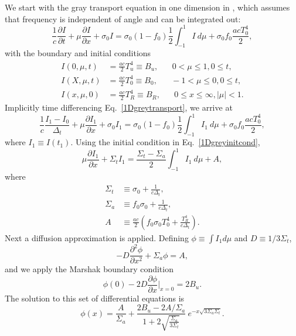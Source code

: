 We start with the gray transport equation in one dimension in \cite{FleckCumm},
which assumes that frequency is independent of angle and can be integrated out:
\begin{equation}
\frac{1}{c}\frac{\partial I}{\partial t} + \mu\frac{\partial I}{\partial x} +
  \sigma_0 I = \sigma_0(1-f_0)\frac{1}{2}\int_{-1}^1 I\ d\mu + \sigma_0f_0
  \frac{acT_0^4}{2},
  \label{1Dgreytransport}
\end{equation}
with the boundary and initial conditions
\begin{align}
I(0,\mu,t)&=\frac{ac}{2}T_u^4\equiv B_u,\hspace{20pt}0<\mu\leq1, 0\leq t,\\
I(X,\mu,t)&=\frac{ac}{2}T_0^4\equiv B_0,\hspace{20pt}-1<\mu\leq0, 0\leq t,\\
I(x,\mu,0)&=\frac{ac}{2}T_R^4\equiv B_R,\hspace{20pt}0\leq x\leq\infty, |\mu|<1.
  \label{1Dgreyinitcond}
\end{align}
Implicitly time differencing Eq.\ \eqref{1Dgreytransport}, we arrive at
\begin{equation}
\frac{1}{c}\frac{I_1-I_0}{\Delta_t}+\mu\frac{\partial I_1}{\partial x} + 
  \sigma_0 I_1 = \sigma_0(1-f_0)\frac{1}{2}\int_{-1}^1I_1\ d\mu + \sigma_0f_0
  \frac{acT_0^4}{2}
  ,\label{1Dgreytimediff}
\end{equation}
where $I_1\equiv I(t_1)$.  Using the initial condition in Eq.\ \eqref{1Dgreyinitcond},
\begin{equation}
\mu\frac{\partial I_1}{\partial x} + \Sigma_tI_1 = \frac{\Sigma_t-\Sigma_a}{2}
  \int_{-1}^1I_1\ d\mu + A,
\end{equation}
where
\begin{align*}
\Sigma_t&\equiv\sigma_0+\frac{1}{c\Delta_t},\\
\Sigma_a&\equiv f_0\sigma_0+\frac{1}{c\Delta_t},\\
A&\equiv\frac{ac}{2}\left(f_0\sigma_0T_0^4 + \frac{T_R^4}{c\Delta_t}\right).
\end{align*}
Next a diffusion approximation is applied.  Defining $\phi\equiv\int I_1d\mu$
and
$D\equiv1/3\Sigma_t$,
\begin{equation}
-D\frac{\partial^2\phi}{\partial x^2} + \Sigma_a\phi=A,
\end{equation}
and we apply the Marshak boundary condition
\[\phi(0)-2D\frac{\partial\phi}{\partial x}\bigg|_{x=0}=2B_u.\]
The solution to this set of differential equations is
\begin{equation}
\phi(x)=\frac{A}{\Sigma_a} + \frac{2B_u-2A/\Sigma_a}{1+
  2\sqrt{\frac{\Sigma_a}{3\Sigma_t}}}\
    e^{-x\sqrt{3\Sigma_a\Sigma_t}}.\label{greyphi}
\end{equation}
